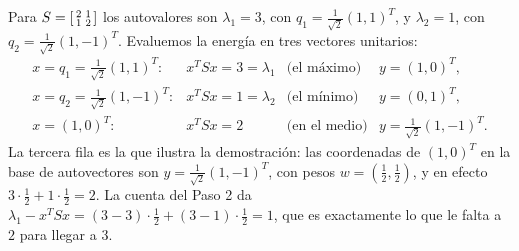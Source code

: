 \begin{example}\label{ej:rayleigh-2x2}
Para $S=\begin{bsmallmatrix} 2 & 1\\ 1 & 2\end{bsmallmatrix}$ los autovalores
son $\lambda_1=3$, con $q_1=\frac1{\sqrt2}(1,1)^T$, y $\lambda_2=1$, con
$q_2=\frac1{\sqrt2}(1,-1)^T$. Evaluemos la energía en tres vectores unitarios:
\[
\begin{array}{llll}
x=q_1=\tfrac1{\sqrt2}(1,1)^T: & x^TSx=3=\lambda_1 & \text{(el máximo)} &
y=(1,0)^T,\\[2pt]
x=q_2=\tfrac1{\sqrt2}(1,-1)^T: & x^TSx=1=\lambda_2 & \text{(el mínimo)} &
y=(0,1)^T,\\[2pt]
x=(1,0)^T: & x^TSx=2 & \text{(en el medio)} &
y=\tfrac1{\sqrt2}(1,-1)^T.
\end{array}
\]
La tercera fila es la que ilustra la demostración: las coordenadas de
$(1,0)^T$ en la base de autovectores son $y=\frac1{\sqrt2}(1,-1)^T$, con pesos
$w=(\frac12,\frac12)$, y en efecto $3\cdot\frac12+1\cdot\frac12=2$. La cuenta
del Paso 2 da $\lambda_1-x^TSx=(3-3)\cdot\frac12+(3-1)\cdot\frac12=1$, que es
exactamente lo que le falta a $2$ para llegar a $3$.
\end{example}

